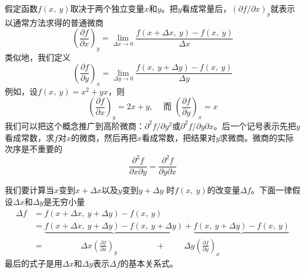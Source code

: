 假定函数$f(x,~y)$取决于两个独立变量$x$和$y$。把$y$看成常量后，$(\partial f/\partial x)_y$就表示以通常方法求得的普通微商
\begin{equation*}
    \left( \frac{\partial f}{\partial x} \right)_y = \lim_{\Delta x \rightarrow 0} \frac{f(x+\Delta x,~y) - f(x,~y)}{\Delta x}
\end{equation*}
类似地，我们定义
\begin{equation*}
    \left( \frac{\partial f}{\partial y} \right)_x = \lim_{\Delta y \rightarrow 0} \frac{f(x,~y+\Delta y) - f(x,~y)}{\Delta y}
\end{equation*}
例如，设$f(x,~y)=x^2+yx$，则
\begin{equation*}
    \left( \frac{\partial f}{\partial x} \right)_y = 2x+y, ~~~~\text{  而  } \left( \frac{\partial f}{\partial y} \right)_x = x
\end{equation*}
我们可以把这个概念推广到高阶微商：$\partial^2f/\partial y^2$或$\partial^2f/\partial y \partial x$。后一个记号表示先把$y$看成常数，求$f$对$x$的微商，然后再把$x$看成常数，把结果对$y$求微商。微商的实际次序是不重要的
\begin{equation*}
    \frac{\partial^2 f}{\partial x \partial y} = \frac{\partial^2 f}{\partial y \partial x}
\end{equation*}

我们要计算当$x$变到$x + \Delta x$以及$y$变到$y +\Delta y$ 时$f(x,~y)$的改变量$\Delta f$。下面一律假设$\Delta x$和$\Delta y$是无穷小量
\begin{equation}
    \label{Eq:I:45:1}
    \begin{aligned}
        \Delta f &= f(x+\Delta x,~y+\Delta y) - f(x,~y) \\
        &= \underbrace{f(x+\Delta x,~y+\Delta y)-f(x,~y+\Delta y)} + \underbrace{f(x,~y+\Delta y)-f(x,~y)} \\
        &= ~~~~~~~~~~~~~~~~~~~~ \Delta x \left(\frac{\partial f}{\partial x}\right)_y ~~~~~~~~~~~~~~~~~~~~~ + ~~~~~~~~~~ \Delta y \left(\frac{\partial f}{\partial y}\right)_x
    \end{aligned}
\end{equation}
最后的式子是用$\Delta x$和$\Delta y$表示$\Delta f$的基本关系式。

